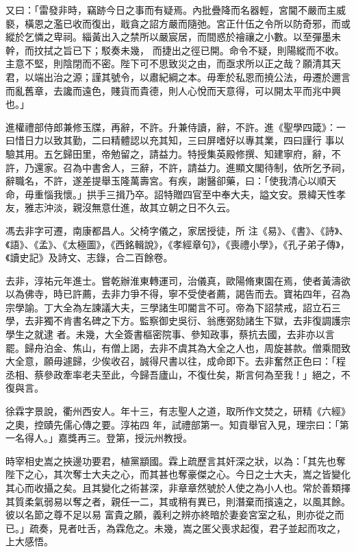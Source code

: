 \begin{pinyinscope}
 又曰：「雷發非時，竊跡今日之事而有疑焉。內批疊降而名器輕，宮閫不嚴而主威褻，橫恩之濫已收而復出，戢貪之詔方嚴而隨弛。宮正什伍之令所以防奇邪，而或縱於乞憐之卑祠。緇黃出入之禁所以嚴宸居，而間惑於禬禳之小數。以至彈墨未幹，而抆拭之旨已下；駁奏未幾，
 而捷出之徑已開。命令不疑，則陽縱而不收。主意不堅，則陰閉而不密。陛下可不思致災之由，而亟求所以正之哉？願清其天君，以端出治之源；謹其號令，以肅紀綱之本。毋牽於私恩而撓公法，毋遷於邇言而亂舊章，去讒而遠色，賤貨而貴德，則人心悅而天意得，可以開太平而兆中興也。」



 進權禮部侍郎兼修玉牒，再辭，不許。升兼侍讀，辭，不許。進《聖學四箴》：一曰惜日力以致其勤，二曰精體認以充其知，三曰屏嗜好以專其業，四曰謹行
 事以驗其用。五乞歸田里，帝勉留之，請益力。特授集英殿修撰、知建寧府，辭，不許，乃還家。召為中書舍人，三辭，不許，請益力。進顯文閣待制，依所乞予祠，辭職名，不許，遂差提舉玉隆萬壽宮。有疾，謝醫卻藥，曰：「使我清心以順天命，毋重惱我懷。」拱手三揖乃卒。詔特贈四官至中奉大夫，謚文安。景緯天性孝友，雅志沖淡，親沒無意仕進，故其立朝之日不久云。



 馮去非字可遷，南康都昌人。父椅字儀之，家居授徒，所
 注《易》、《書》、《詩》、《語》、《孟》、《太極圖》，《西銘輯說》，《孝經章句》，《喪禮小學》，《孔子弟子傳》，《讀史記》及詩文、志錄，合二百餘卷。



 去非，淳祐元年進士。嘗乾辦淮東轉運司，治儀真，歐陽脩東園在焉，使者黃濤欲以為佛寺，時已許薦，去非力爭不得，寧不受使者薦，謁告而去。寶祐四年，召為宗學諭。丁大全為左諫議大夫，三學諸生叩閽言不可。帝為下詔禁戒，詔立石三學，去非獨不肯書名碑之下方。監察御史吳衍、翁應弼劾諸生下獄，去非復調護宗學生之就逮
 者。未幾，大全簽書樞密院事、參知政事，蔡抗去國，去非亦以言罷。歸舟泊金、焦山，有僧上謁，去非不虞其為大全之人也，周旋甚款。僧乘間致大全意，願毋遽歸，少俟收召，誠得尺書以往，成命即下。去非奮然正色曰：「程丞相、蔡參政牽率老夫至此，今歸吾廬山，不復仕矣，斯言何為至我！」絕之，不復與言。



 徐霖字景說，衢州西安人。年十三，有志聖人之道，取所作文焚之，研精《六經》之奧，控賾先儒心傳之要。淳祐四
 年，試禮部第一。知貢舉官入見，理宗曰：「第一名得人。」嘉獎再三。登第，授沅州教授。



 時宰相史嵩之挾邊功要君，植黨顓國。霖上疏歷言其奸深之狀，以為：「其先也奪陛下之心，其次奪士大夫之心，而其甚也奪豪傑之心。今日之士大夫，嵩之皆變化其心而收攝之矣。且其變化之術甚深，非章章然號於人使之為小人也。常於善類擇其質柔氣弱易以奪之者，親任一二，其或稍有異已，則潛棄而擯遠之，以風其餘。彼以名節之尊不足以易
 富貴之願，義利之辨亦終暗於妻妾宮室之私，則亦從之而已。」疏奏，見者吐舌，為霖危之。未幾，嵩之匿父喪求起復，君子並起而攻之，上大感悟。




\end{pinyinscope}
